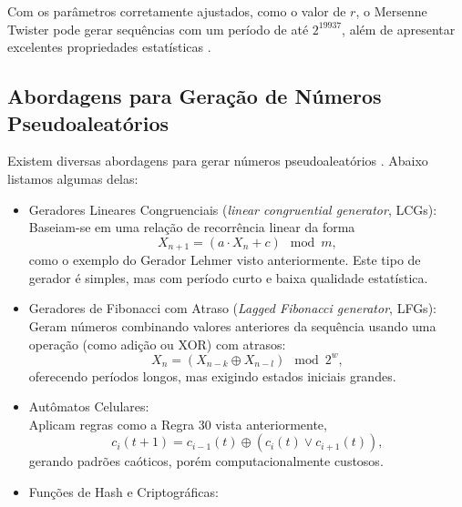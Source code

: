 Com os parâmetros corretamente ajustados, como o valor de $r$, o Mersenne Twister pode gerar
sequências com um período de até $2^{19937}$, além de apresentar excelentes
propriedades estatísticas \parencite{matsumoto1998mersenne}.





\subsection{Abordagens para Geração de Números Pseudoaleatórios}

Existem diversas abordagens para gerar números pseudoaleatórios
\parencite{knuth1997art,matsumoto1998mersenne,wolfram2002,kocarev2011chaos,kneusel2018random}.
Abaixo listamos algumas delas:

\begin{itemize}
  \item \label{itm:LCG} Geradores Lineares Congruenciais (\textit{linear congruential generator}, LCGs): \\
	Baseiam-se em uma relação de recorrência linear da forma 
	\begin{equation}
	    X_{n+1} = (a \cdot X_n + c) \mod m ,
	\end{equation} 
  como o exemplo do Gerador Lehmer visto anteriormente.
	Este tipo de gerador é simples, mas com período curto e baixa qualidade estatística.
\item Geradores de Fibonacci com Atraso (\textit{Lagged Fibonacci generator}, LFGs): \\
	Geram números combinando valores anteriores da sequência usando uma operação (como adição ou XOR) com atrasos:
	\begin{equation}
	    X_n = (X_{n-k} \oplus X_{n-l}) \mod 2^w ,
	\end{equation} 
	oferecendo períodos longos, mas exigindo estados iniciais grandes.
    \item Autômatos Celulares: \\ 
	Aplicam regras como a Regra 30 vista anteriormente, 
	\begin{equation} 
	    c_i(t+1) = c_{i-1}(t) \oplus (c_i(t) \lor c_{i+1}(t)) ,
	\end{equation} 
	gerando padrões caóticos, porém computacionalmente custosos.
    \item Funções de Hash e Criptográficas: \\

\end{itemize}
